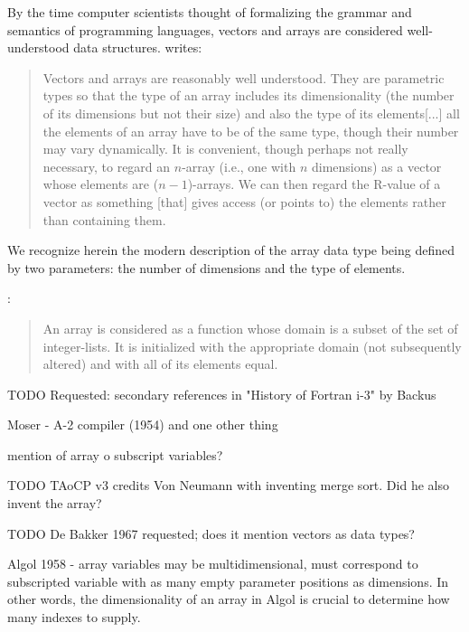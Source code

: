 By the time computer scientists thought of formalizing the grammar and semantics of programming languages,
vectors and arrays are considered well-understood data structures. \cite[\S 3.7.7, pp. 43--44]{Strachey1967} writes:
\begin{quote}
Vectors and arrays are reasonably well understood. They are parametric types so that the type of an array includes its dimensionality (the number of
its dimensions but not their size) and also the type of its elements[...]
all the elements of an array have to be of the same type, though their number may vary dynamically.
It is convenient, though perhaps not really necessary, to regard an $n$-array
(i.e., one with $n$ dimensions) as a vector whose elements are ($n-1$)-arrays.
We can then regard the R-value of a vector as something [that] gives access (or points to) the elements rather than containing them.
\end{quote}
We recognize herein the modern description of the array data type being defined by
two parameters: the number of dimensions and the type of elements.

\cite{Landin1965}:
\begin{quote}
An array is considered as a function whose domain is a subset of the set of integer-lists.
It is initialized with the appropriate domain (not subsequently altered) and with all of its elements equal.
\end{quote}

TODO Requested: secondary references in "History of Fortran i-3" by Backus

Moser - A-2 compiler (1954) and one other thing

mention of array o subscript variables?

TODO TAoCP v3 credits Von Neumann with inventing merge sort. Did he also invent the array?

TODO De Bakker 1967 requested; does it mention vectors as data types?

Algol 1958 - array variables may be multidimensional, must correspond to subscripted variable with as many empty parameter positions as dimensions.
In other words, the dimensionality of an array in Algol is crucial to determine how many indexes to supply.

